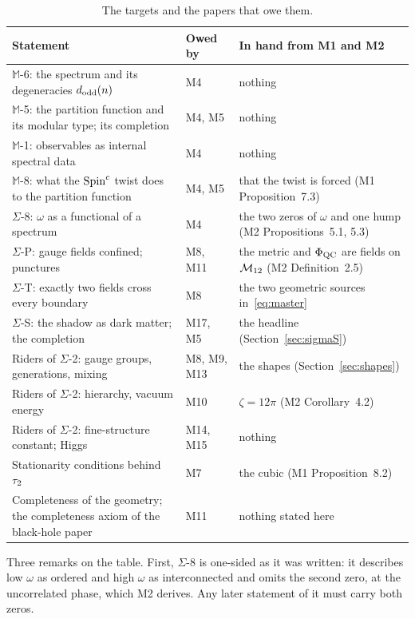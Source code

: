 \documentclass[11pt,a4paper]{article}
\theoremstyle{plain}
\theoremstyle{definition}
\theoremstyle{remark}
\newcommand{\Max}[1]{$\mathbb{M}$-#1}
\newcommand{\Sig}[1]{$\Sigma$-#1}
\begin{document}
\begin{table}[t]
\begin{center}\small
\caption{The targets and the papers that owe them.}\label{tab:targets}
\begin{tabular}{@{}p{}p{}p{}@{}}
\toprule
Statement & Owed by & In hand from M1 and M2 \\
\midrule
\Max{6}: the spectrum and its degeneracies $d_{\mathrm{odd}}(n)$ & M4 & nothing \\
\Max{5}: the partition function and its modular type; its completion & M4, M5 & nothing \\
\Max{1}: observables as internal spectral data & M4 & nothing \\
\Max{8}: what the $\text{Spin}^c$ twist does to the partition function & M4, M5 & that the twist is forced (M1 Proposition~7.3) \\
\Sig{8}: $\omega$ as a functional of a spectrum & M4 & the two zeros of $\omega$ and one hump (M2 Propositions~5.1, 5.3) \\
\Sig{P}: gauge fields confined; punctures & M8, M11 & the metric and $\Phi_{\mathrm{QC}}$ are fields on $\mathcal{M}_{12}$ (M2 Definition~2.5) \\
\Sig{T}: exactly two fields cross every boundary & M8 & the two geometric sources in~\eqref{eq:master} \\
\Sig{S}: the shadow as dark matter; the completion & M17, M5 & the headline (Section~\ref{sec:sigmaS}) \\
Riders of \Sig{2}: gauge groups, generations, mixing & M8, M9, M13 & the shapes (Section~\ref{sec:shapes}) \\
Riders of \Sig{2}: hierarchy, vacuum energy & M10 & $\zeta=12\pi$ (M2 Corollary~4.2) \\
Riders of \Sig{2}: fine-structure constant; Higgs & M14, M15 & nothing \\
Stationarity conditions behind $\tau_2$ & M7 & the cubic (M1 Proposition~8.2) \\
Completeness of the geometry; the completeness axiom of the black-hole paper & M11 & nothing stated here \\
\bottomrule
\end{tabular}
\end{center}
\end{table}

Three remarks on the table. First, \Sig{8} is one-sided as it was written: it describes low $\omega$ as ordered and high $\omega$ as interconnected and omits the second zero, at the uncorrelated phase, which M2 derives. Any later statement of it must carry both zeros.
\end{document}
